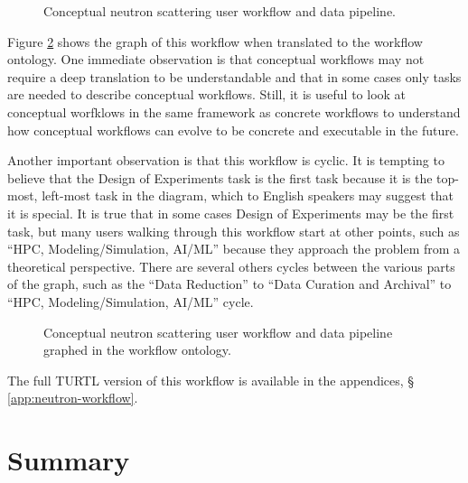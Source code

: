 \begin{figure}[htbp]
\centering
{}
\caption{Conceptual neutron scattering user workflow and data pipeline.}
\label{neutron-workflow}
\end{figure}

Figure \ref{neutron-workflow-graph} shows the graph of this workflow when
translated to the workflow ontology. One immediate observation is that
conceptual workflows may not require a deep translation to be understandable
and that in some cases only tasks are needed to describe conceptual workflows.
Still, it is useful to look at conceptual worfklows in the same framework as
concrete workflows to understand how conceptual workflows can evolve to be
concrete and executable in the future.

Another important observation is that this workflow is cyclic. It is tempting to
believe that the Design of Experiments task is the first task because it is the
top-most, left-most task in the diagram, which to English speakers may suggest
that it is special. It is true that in some cases Design of Experiments may be
the first task, but many users walking through this workflow start at other
points, such as ``HPC, Modeling/Simulation, AI/ML'' because they approach
the problem from a theoretical perspective. There are several others cycles
between the various parts of the graph, such as the ``Data Reduction'' to
``Data Curation and Archival'' to ``HPC, Modeling/Simulation, AI/ML'' cycle.

\begin{figure}[htbp]
\centering
{}
\caption{Conceptual neutron scattering user workflow and data pipeline
graphed in the workflow ontology.}
\label{neutron-workflow-graph}
\end{figure}

The full TURTL version of this workflow is available in the appendices, \S
\ref{app:neutron-workflow}.

\section{Summary}
\label{workflows-ont-summary}

